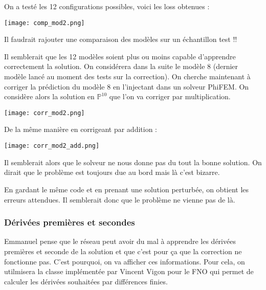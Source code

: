 On a testé les 12 configurations possibles, voici les loss obtenues :

\begin{minipage}{\linewidth}
	\centering
	\texttt{[image: comp\_mod2.png]}
\end{minipage}

\begin{Rem}
	Il faudrait rajouter une comparaison des modèles sur un échantillon test !!
\end{Rem}

\newpage


Il semblerait que les 12 modèles soient plus ou moins capable d'apprendre correctement la solution. On considérera dans la suite le modèle 8 (dernier modèle lancé au moment des tests sur la correction). On cherche maintenant à corriger la prédiction du modèle 8 en l'injectant dans un solveur PhiFEM. On considère alors la solution en $\mathbb{P}^{10}$ que l'on va corriger par multiplication.

\begin{minipage}{\linewidth}
	\centering
	\texttt{[image: corr\_mod2.png]}
\end{minipage}

De la même manière en corrigeant par addition :

\begin{minipage}{\linewidth}
	\centering
	\texttt{[image: corr\_mod2\_add.png]}
\end{minipage}

Il semblerait alors que le solveur ne nous donne pas du tout la bonne solution. On dirait que le problème est toujours due au bord mais là c'est bizarre.

\begin{Rem}
	En gardant le même code et en prenant une solution perturbée, on obtient les erreurs attendues. Il semblerait donc que le problème ne vienne pas de là.
\end{Rem}

\subsubsection{Dérivées premières et secondes}

Emmanuel pense que le réseau peut avoir du mal à apprendre les dérivées premières et seconde de la solution et que c'est pour ça que la correction ne fonctionne pas. C'est pourquoi, on va afficher ces informations. Pour cela, on utilmisera la classe implémentée par Vincent Vigon pour le FNO qui permet de calculer les dérivées souhaitées par différences finies.

